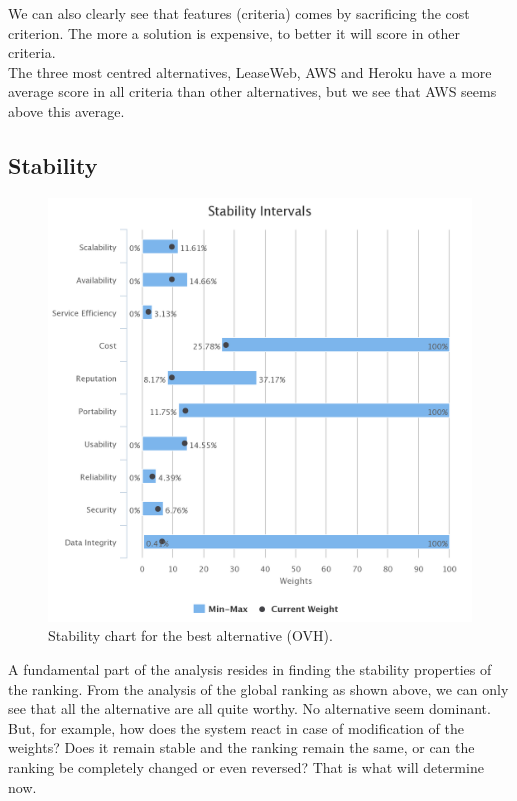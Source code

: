 \documentclass[a4paper,11pt]{article}
\begin{document}
We can also clearly see that features (criteria) comes by sacrificing the \og cost \fg{} criterion. The more a solution is expensive, to better it will score in other criteria.\\

The three most centred alternatives, LeaseWeb, AWS and Heroku have a more average score in all criteria than other alternatives, but we see that AWS seems above this average.\\

\subsection{Stability}

\begin{figure}
  \centering
  \includegraphics[width=\textwidth]{img/Result/stability_chart.png}
  \caption{Stability chart for the best alternative (OVH).}
  \label{fig:stab}
\end{figure}

A fundamental part of the analysis resides in finding the stability properties of the ranking. From the analysis of the global ranking as shown above, we can only see that all the alternative are all quite worthy. No alternative seem dominant. But, for example, how does the system react in case of modification of the weights? Does it remain stable and the ranking remain the same, or can the ranking be completely changed or even reversed? That is what will determine now.\\
\end{document}
